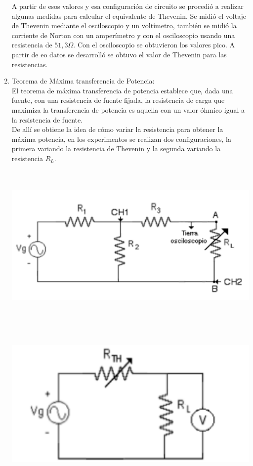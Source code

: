 \documentclass[12pt]{article}
\begin{document}
\begin{enumerate}
		A partir de esos valores y esa configuración de circuito se procedió a realizar algunas medidas para calcular el equivalente de Thevenin. Se midió el voltaje de Thevenin mediante el osciloscopio y un voltímetro, también se midió la corriente de Norton con un amperímetro y con el osciloscopio usando una resistencia de $51,3\Omega$. Con el osciloscopio se obtuvieron los valores pico. A partir de eo datos se desarrolló se obtuvo el valor de Thevenin para las resistencias.\\
		
		\item Teorema de Máxima transferencia de Potencia:\\
		
		El teorema de máxima transferencia de potencia establece que, dada una fuente, con una resistencia de fuente fijada, la resistencia de carga que maximiza la transferencia de potencia es aquella con un valor óhmico igual a la resistencia de fuente.\\
		
		De allí se obtiene la idea de cómo variar la resistencia para obtener la máxima potencia, en los experimentos se realizan dos configuraciones, la primera variando la resistencia de Thevenin y la segunda variando la resistencia $R_L$.
		
		\begin{center}
			\includegraphics[width=16cm,height=8cm]{Img/circ_2}
		\end{center}
		
		\begin{center}
			\includegraphics[width=16cm,height=8cm]{Img/circ_3}
		\end{center}
		

\end{enumerate}
\end{document}
